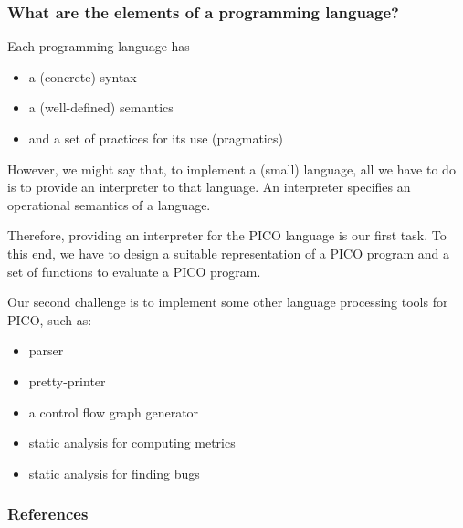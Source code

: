\documentclass{beamer}
\begin{document}
\begin{frame}
  \frametitle{What are the elements of a programming language?}

  \pause
  \begin{block}{Each programming language has}
  \begin{itemize}
    \item a (concrete) syntax
    \item a (well-defined) semantics
    \item and a set of practices for its use (pragmatics)   
  \end{itemize}
  \end{block}
  \pause

  However, we might say that, to implement a (small) language,
  all we have to do is to provide an {\color{blue}interpreter} to
  that language. \pause An interpreter specifies an operational
  semantics of a language. 
\end{frame}

\begin{frame}

  Therefore, providing an interpreter for the \textsc{PICO} language
  is our first task. To this end, we have to {\color{blue}design} a
  suitable representation of a \textsc{PICO} program and a set
  of functions to evaluate a \textsc{PICO} program.
  
\end{frame}


\begin{frame}
  Our second challenge is to implement some other language
  processing tools for \textsc{PICO}, such as:

  \begin{itemize}
   \item parser
   \item pretty-printer
   \item a control flow graph generator  
   \item static analysis for computing metrics
   \item static analysis for finding bugs  
  \end{itemize}
\end{frame}

\begin{frame}[allowframebreaks]
  \frametitle{References}
  
  
\end{frame}

\begin{frame}
\titlepage
\end{frame}
\end{document}

